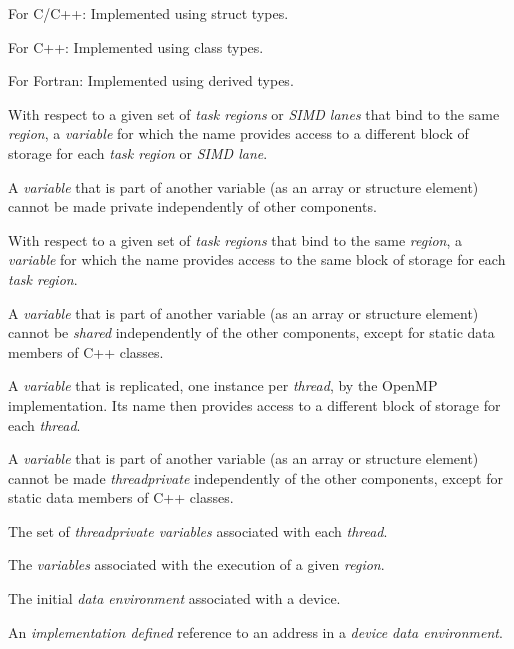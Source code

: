 For C/C++: 
\nopagebreak
Implemented using struct types.

For C++: 
\nopagebreak
Implemented using class types.        

For Fortran: 
\nopagebreak
Implemented using derived types.        
\glossarydefend

\glossarydefstart
With respect to a given set of \emph{task regions} or \emph{SIMD lanes} that bind to the same
 \emph{region}, a \emph{variable} for which the name provides access to a different block of 
storage for each \emph{task region} or \emph{SIMD lane}.

A \emph{variable} that is part of another variable (as an array or structure element) cannot 
be made private independently of other components.
\glossarydefend

\glossarydefstart
With respect to a given set of \emph{task regions} that bind to the same  
\emph{region}, a \emph{variable} for which the name provides access to the same block of storage for 
each \emph{task region}.

A \emph{variable} that is part of another variable (as an array or structure element) cannot 
be \emph{shared} independently of the other components, except for static data members 
of C++ classes.
\glossarydefend

\glossarydefstart
A \emph{variable} that is replicated, one instance per \emph{thread}, by the OpenMP 
implementation. Its name then provides access to a different block of storage for 
each \emph{thread}.

A \emph{variable} that is part of another variable (as an array or structure element) cannot 
be made \emph{threadprivate} independently of the other components, except for static 
data members of C++ classes. 
\glossarydefend

\glossarydefstart
The set of \emph{threadprivate variables} associated with each \emph{thread}.
\glossarydefend

\glossarydefstart
The \emph{variables} associated with the execution of a given \emph{region}. 
\glossarydefend

\glossarydefstart
The initial \emph{data environment} associated with a device.
\glossarydefend
\bigskip

\glossarydefstart
An \emph{implementation defined} reference to an address in a \emph{device
  data environment}.
\glossarydefend


